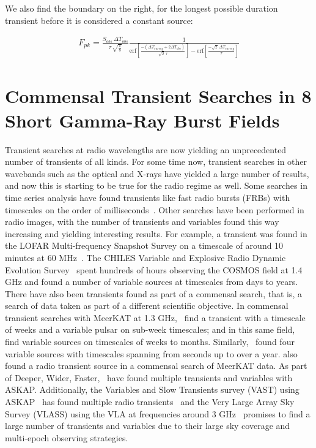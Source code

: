 \documentclass[12pt]{article}
\begin{document}
We also find the boundary on the right, for the longest possible duration transient before it is considered a constant source:

\begin{equation*}
\begin{split}
    F_{pk} = \frac{S_{obs}\,\Delta T_{obs}}{\tau\, \sqrt{\frac{\pi}{8}}}\frac{1}{\text{erf}\left[\frac{-(\Delta T_{survey} + 2\Delta T_{obs})}{\sqrt{2}\,\tau}\right] - \text{erf}\left[\frac{-\sqrt{2}\,\Delta T_{survey}}{\tau}\right]}
\end{split}
\end{equation*}
\newpage
\section{Commensal Transient Searches in 8 Short Gamma-Ray Burst Fields}

Transient searches at radio wavelengths are now yielding an unprecedented number of transients of all kinds. For some time now, transient searches in other wavebands such as the optical and X-rays have yielded a large number of results, and now this is starting to be true for the radio regime as well. Some searches in time series analysis have found transients like fast radio bursts (FRBs) with timescales on the order of milliseconds~\citep[e.g.,][]{2007Sci...318..777L,2021ApJS..257...59C}. Other searches have been performed in radio images, with the number of transients and variables found this way increasing and yielding interesting results. For example, a transient was found in the LOFAR Multi-frequency Snapshot Survey on a timescale of around 10 minutes at 60 MHz~\citep{2016MNRAS.456.2321S}. The CHILES Variable and Explosive Radio Dynamic Evolution Survey~\citep{2021ApJ...923...31S} spent hundreds of hours observing the COSMOS field at 1.4 GHz and found a number of variable sources at timescales from days to years. There have also been transients found as part of a commensal search, that is, a search of data taken as part of a different scientific objective. In commensal transient searches with MeerKAT at 1.3 GHz,~\citet{2020MNRAS.491..560D} find a transient with a timescale of weeks and a variable pulsar on sub-week timescales; and in this same field,~\citet{2022MNRAS.512.5037D} find variable sources on timescales of weeks to months. Similarly,~\citet{2022MNRAS.517.2894R} found four variable sources with timescales spanning from seconds up to over a year. \citet{2022MNRAS.513.3482A} also found a radio transient source in a commensal search of MeerKAT data. As part of Deeper, Wider, Faster,~\citet{2023MNRAS.519.4684D} have found multiple transients and variables with ASKAP. Additionally, the Variables and Slow Transients survey (VAST) using ASKAP~\citep{2021PASA...38...54M} has found multiple radio transients~\citep{2021ApJ...920...45W,2022MNRAS.516.5972W} and the Very Large Array Sky Survey (VLASS) using the VLA at frequencies around 3 GHz~\citep{2020PASP..132c5001L} promises to find a large number of transients and variables due to their large sky coverage and multi-epoch observing strategies. 
\end{document}
